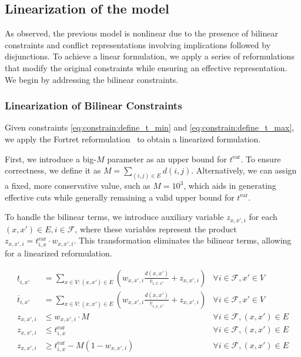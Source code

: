 \documentclass[../../thesis.tex]{subfiles}
\begin{document}
\subsection{Linearization of the model}\label{sec:linearization}

As observed, the previous model is nonlinear due to the presence of bilinear constraints and conflict representations involving implications followed by disjunctions. 
To achieve a linear formulation, we apply a series of reformulations that modify the original constraints while ensuring an effective representation.  
We begin by addressing the bilinear constraints.

\subsubsection{Linearization of Bilinear Constraints}
\label{sec:linearization:times}

Given constraints \eqref{eq:constrain:define_t_min} and \eqref{eq:constrain:define_t_max}, we apply the Fortret reformulation~\cite{fortet-1960} to obtain a linearized formulation.

First, we introduce a big-$M$ parameter as an upper bound for $t^\text{ear}$. To ensure correctness, we define it as $M = \sum_{(i,j) \in E} d(i,j)$. Alternatively, we can assign a fixed, more conservative value, such as $M = 10^3$, which aids in generating effective cuts while generally remaining a valid upper bound for $t^\text{ear}$.

To handle the bilinear terms, we introduce auxiliary variable $z_{x,x',i}$  for each $(x,x') \in E, i \in \mathcal F$, where these variables represent the product $z_{x,x',i} = t^\text{ear}_{i,x} \cdot w_{x,x',i}$. This transformation eliminates the bilinear terms, allowing for a linearized reformulation.


\begin{align}
    \underline t_{i,x'} &= \sum_{x\in V: (x,x')\in E} \left(w_{x,x',i} \frac{d(x,x')}{\overline v_{i,x,x'}} +  z_{x,x',i}\right) & \forall i \in \mathcal{F}, x'\in V\\
    \overline t_{i,x'} &= \sum_{x\in V: (x,x')\in E}\left(w_{x,x',i}\frac{d(x,x')}{\underline v_{i,x,x'}}+ z_{x,x',i}\right) 
    &\forall i \in \mathcal{F}, x'\in V\\
     z_{x,x',i} &\leq w_{x,x',i}\cdot M &\forall i\in \mathcal{F}, (x,x')\in E\\
     z_{x,x',i} &\leq t^\text{ear}_{i,x} &\forall i\in \mathcal{F}, (x,x')\in E\\
     z_{x,x',i} &\geq t^\text{ear}_{i,x} - M (1-w_{x,x',i}) &\forall i\in \mathcal{F}, (x,x')\in E
\end{align}
\end{document}
